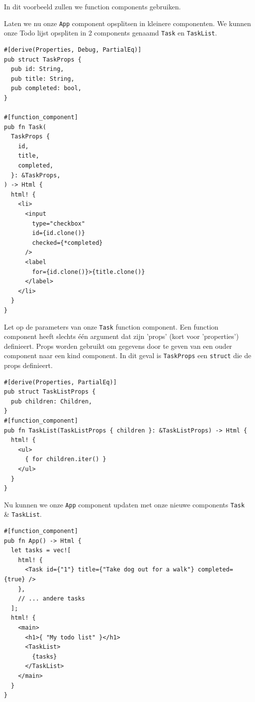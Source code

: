 In dit voorbeeld zullen we function components gebruiken.

Laten we nu onze \texttt{App} component opsplitsen in kleinere componenten. We kunnen onze
Todo lijst opspliten in 2 components genaamd \texttt{Task} en \texttt{TaskList}.

\begin{listing}[h]
\begin{verbatim}
#[derive(Properties, Debug, PartialEq)]
pub struct TaskProps {
  pub id: String,
  pub title: String,
  pub completed: bool,
}

#[function_component]
pub fn Task(
  TaskProps {
    id,
    title,
    completed,
  }: &TaskProps,
) -> Html {
  html! {
    <li>
      <input
        type="checkbox"
        id={id.clone()}
        checked={*completed}
      />
      <label
        for={id.clone()}>{title.clone()}
      </label>
    </li>
  }
}
\end{verbatim}
\caption{task.rs}
\end{listing}

\clearpage

Let op de parameters van onze \texttt{Task} function component. Een function component
heeft slechts één argument dat zijn 'props' (kort voor 'properties') definieert. Props worden
gebruikt om gegevens door te geven van een ouder component naar een kind component. In dit geval is
\texttt{TaskProps} een \texttt{struct} die de props definieert.

\begin{listing}[h]
\begin{verbatim}
#[derive(Properties, PartialEq)]
pub struct TaskListProps {
  pub children: Children,
}
#[function_component]
pub fn TaskList(TaskListProps { children }: &TaskListProps) -> Html {
  html! {
    <ul>
      { for children.iter() }
    </ul>
  }
}
\end{verbatim}
\caption{task\_list.rs}
\end{listing}

Nu kunnen we onze \texttt{App} component updaten met onze nieuwe components
\texttt{Task} \& \texttt{TaskList}.

\begin{listing}[h]
\begin{verbatim}
#[function_component]
pub fn App() -> Html {
  let tasks = vec![
    html! { 
      <Task id={"1"} title={"Take dog out for a walk"} completed={true} /> 
    },
    // ... andere tasks
  ];
  html! {
    <main>
      <h1>{ "My todo list" }</h1>
      <TaskList>
        {tasks}
      </TaskList>
    </main>
  }
}
\end{verbatim}
\caption{app.rs}
\end{listing}

